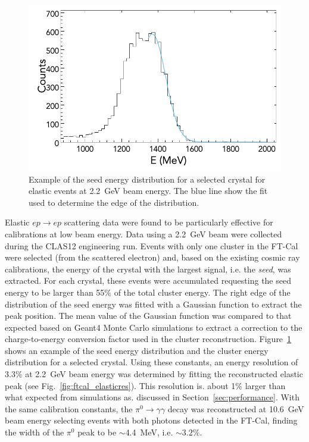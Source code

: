 \begin{figure}
\includegraphics[width=0.9\columnwidth]{fig/ftcal_elastic_seed.png}
\caption{Example of the seed energy distribution for a selected crystal for
  elastic events at 2.2~GeV beam energy. The blue line show the fit used to determine the edge of the distribution.}
\label{fig:ftcal_elasticcal}
\end{figure}

Elastic $ep \to ep$ scattering data were found to be particularly effective for calibrations at low beam energy.
Data using a 2.2~GeV beam were collected during the CLAS12 engineering run. Events with only one cluster in the FT-Cal
were selected (from the scattered electron) and, based on the existing cosmic ray calibrations, the energy of the
crystal with the largest signal, i.e. the {\it seed}, was extracted. For each crystal, these events were accumulated
requesting the seed energy to be larger than 55\% of the total cluster energy. The right edge of the distribution of
the seed energy was fitted with a Gaussian function to extract the peak position. The mean value of the Gaussian
function was compared to that expected based on Geant4 Monte Carlo simulations to extract a correction to the
charge-to-energy conversion factor used in the cluster reconstruction. Figure~\ref{fig:ftcal_elasticcal} shows an
example of the seed energy distribution and the cluster energy distribution for a selected crystal. Using these
constants, an energy resolution of 3.3\% at 2.2~GeV beam energy was determined by fitting the reconstructed
elastic peak (see Fig.~\ref{fig:ftcal_elasticres}). This resolution is. about 1\% larger than what expected from simulations as. discussed in Section~\ref{sec:performance}. With the same calibration constants, the $\pi^0\to\gamma\gamma$
decay was reconstructed at 10.6~GeV beam energy selecting events with both photons detected in the FT-Cal, finding
the width of the $\pi^0$ peak to be $\sim$4.4~MeV, i.e. $\sim 3.2\%$.

